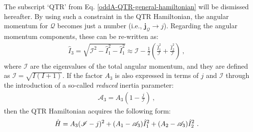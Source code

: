 The subscript `QTR' from Eq. \ref{oddA-QTR-general-hamiltonian} will be dismissed hereafter. By using such a constraint in the QTR Hamiltonian, the angular momentum for $\mathcal{Q}$ becomes just a number (i.e., $\mathbf{j}_{\mathcal{Q}}\to j$).
Regarding the angular momentum components, these can be re-written as:
\begin{align}
    \hat{I}_3=\sqrt{\mathscr{I}^2-\hat{I}_1^2-\hat{I}_1^2}\approx\mathscr{I}-\frac{1}{2}\left(\frac{\hat{I}_1^2}{\mathscr{I}}+\frac{\hat{I}_2^2}{\mathscr{I}}\right)\ ,
\end{align}
where $\mathscr{I}$ are the eigenvalues of the total angular momentum, and they are defined as $\mathscr{I}=\sqrt{I(I+1)}$.
If the factor $A_3$ is also expressed in terms of $j$ and $\mathscr{I}$ through the introduction of a so-called \emph{reduced} inertia parameter:
\begin{align}
    \mathscr{A}_3=A_3\left(1-\frac{j}{\mathscr{I}}\right)\ ,
    \label{reduced-inertia-parameter-A3}
\end{align}
then the QTR Hamiltonian acquires the following form:
\begin{align}
    \hat{H}={\color{black}A_3(\mathscr{I}-j)^2}+{\color{black}(A_1-\mathscr{A}_3)\hat{I}_1^2+(A_2-\mathscr{A}_3)\hat{I}_2^2}\ .
    \label{HA-QTR-Hamiltonian}
\end{align}

